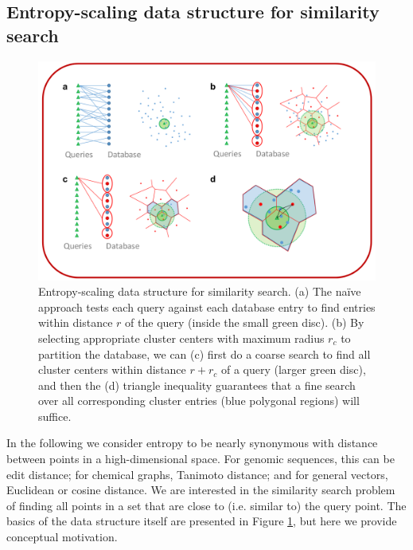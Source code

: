 \documentclass[review,preprint,12pt]{elsarticle}
\theoremstyle{definition}
\theoremstyle{remark}
\numberwithin{equation}{section}
\begin{document}
\subsection{Entropy-scaling data structure for similarity search}
\begin{figure}[p]
    \centering
    \centerline{\includegraphics[width=8in]{assets/dataStructure.png}}
    \caption{ Entropy-scaling data structure for similarity search. %
            (a) The na\"ive approach tests each query against each database entry to find entries within distance $r$ of the query (inside the small green disc). %
            (b) By selecting appropriate cluster centers with maximum radius $r_c$ to partition the database, we can (c) first do a coarse search to find all cluster centers within distance $r+r_c$ of a query (larger green disc), %
 and then the (d) triangle inequality guarantees that a fine search over all corresponding cluster entries (blue polygonal regions) will suffice.}
    \label{fig:dataStructure}
\end{figure}

In the following we consider entropy to be nearly synonymous with distance between points in a high-dimensional space.
For genomic sequences, this can be edit distance; for chemical graphs, Tanimoto 
distance; and for general vectors, Euclidean or cosine distance.
We are interested in the similarity search problem of
finding all points in a set that are close to (i.e. similar to) the query point.
The basics of the data structure itself are presented in Figure \ref{fig:dataStructure}, but here we provide conceptual motivation.
\end{document}
